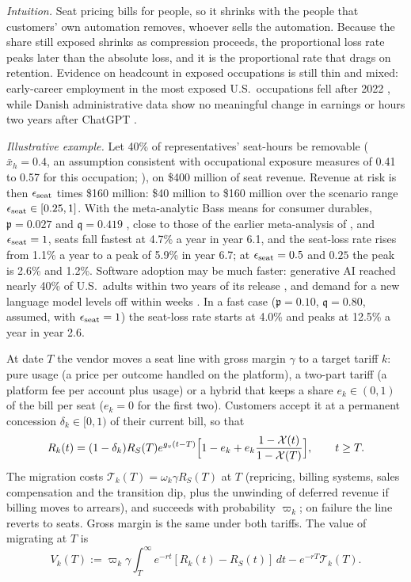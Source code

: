 \noindent\emph{Intuition.} Seat pricing bills for people, so it shrinks with the people that customers' own automation removes, whoever sells the automation. Because the share still exposed shrinks as compression proceeds, the proportional loss rate peaks later than the absolute loss, and it is the proportional rate that drags on retention. Evidence on headcount in exposed occupations is still thin and mixed: early-career employment in the most exposed U.S.\ occupations fell after 2022 \citep{brynjolfsson2025canaries}, while Danish administrative data show no meaningful change in earnings or hours two years after ChatGPT \citep{humlum2025still}.

\noindent\emph{Illustrative example.} Let 40\% of representatives' seat-hours be removable ($\bar x_h=0.4$, an assumption consistent with occupational exposure measures of 0.41 to 0.57 for this occupation; \citealp{tomlinson2025working,eloundou2024gpts}), on \$400 million of seat revenue. Revenue at risk is then $\epsilon_{\rm seat}$ times \$160 million: \$40 million to \$160 million over the scenario range $\epsilon_{\rm seat}\in[0.25,1]$. With the meta-analytic Bass means for consumer durables, $\mathfrak p=0.027$ and $\mathfrak q=0.419$ \citep{vandenbulte2004social}, close to those of the earlier meta-analysis of \citet{sultan1990meta}, and $\epsilon_{\rm seat}=1$, seats fall fastest at 4.7\% a year in year 6.1, and the seat-loss rate rises from 1.1\% a year to a peak of 5.9\% in year 6.7; at $\epsilon_{\rm seat}=0.5$ and $0.25$ the peak is 2.6\% and 1.2\%. Software adoption may be much faster: generative AI reached nearly 40\% of U.S.\ adults within two years of its release \citep{bick2026rapid}, and demand for a new language model levels off within weeks \citep{fradkin2025demand}. In a fast case ($\mathfrak p=0.10$, $\mathfrak q=0.80$, assumed, with $\epsilon_{\rm seat}=1$) the seat-loss rate starts at 4.0\% and peaks at 12.5\% a year in year 2.6.

\begin{assumption}\label{ass:prod-migrate}
At date $T$ the vendor moves a seat line with gross margin $\gamma$ to a target tariff $k$: pure usage (a price per outcome handled on the platform), a two-part tariff (a platform fee per account plus usage) or a hybrid that keeps a share $e_k\in(0,1)$ of the bill per seat ($e_k=0$ for the first two). Customers accept it at a permanent concession $\delta_k\in[0,1)$ of their current bill, so that
\[
R_k(t)=(1-\delta_k)R_S(T)e^{g_v(t-T)}\Bigl[1-e_k+e_k\frac{1-\mathcal X(t)}{1-\mathcal X(T)}\Bigr],\qquad t\ge T .
\]
The migration costs $\mathcal T_k(T)=\omega_k\gamma R_S(T)$ at $T$ (repricing, billing systems, sales compensation and the transition dip, plus the unwinding of deferred revenue if billing moves to arrears), and succeeds with probability $\varpi_k$; on failure the line reverts to seats. Gross margin is the same under both tariffs. The value of migrating at $T$ is
\[
V_k(T):=\varpi_k\gamma\int_T^\infty e^{-rt}[R_k(t)-R_S(t)]\,dt-e^{-rT}\mathcal T_k(T).
\]
\end{assumption}


